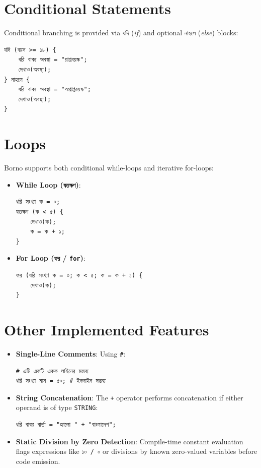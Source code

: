 \documentclass[12pt, a4paper]{report}
\begin{document}
\section{Conditional Statements}
Conditional branching is provided via \texttt{যদি} (\textit{if}) and optional \texttt{নাহলে} (\textit{else}) blocks:
\begin{lstlisting}
যদি (বয়স >= ১৮) {
    ধরি বাক্য অবস্থা = "প্রাপ্তবয়স্ক";
    দেখাও(অবস্থা);
} নাহলে {
    ধরি বাক্য অবস্থা = "অপ্রাপ্তবয়স্ক";
    দেখাও(অবস্থা);
}
\end{lstlisting}

\section{Loops}
Borno supports both conditional while-loops and iterative for-loops:
\begin{itemize}
    \item \textbf{While Loop (\texttt{যতক্ষণ})}:
\begin{lstlisting}
ধরি সংখ্যা ক = ০;
যতক্ষণ (ক < ৫) {
    দেখাও(ক);
    ক = ক + ১;
}
\end{lstlisting}
    \item \textbf{For Loop (\texttt{ফর} / \texttt{for})}:
\begin{lstlisting}
ফর (ধরি সংখ্যা ক = ০; ক < ৫; ক = ক + ১) {
    দেখাও(ক);
}
\end{lstlisting}
\end{itemize}

\section{Other Implemented Features}
\begin{itemize}
    \item \textbf{Single-Line Comments}: Using \texttt{\#}:
\begin{lstlisting}
# এটি একটি একক লাইনের মন্তব্য
ধরি সংখ্যা মান = ৫০; # ইনলাইন মন্তব্য
\end{lstlisting}
    \item \textbf{String Concatenation}: The \texttt{+} operator performs concatenation if either operand is of type \texttt{STRING}:
\begin{lstlisting}
ধরি বাক্য বার্তা = "হ্যালো " + "বাংলাদেশ";
\end{lstlisting}
    \item \textbf{Static Division by Zero Detection}: Compile-time constant evaluation flags expressions like \texttt{১০ / ০} or divisions by known zero-valued variables before code emission.
\end{itemize}
\end{document}
